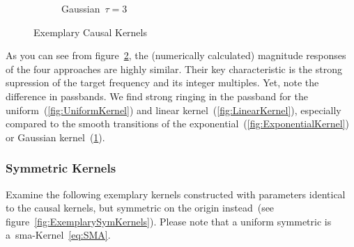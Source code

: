 \documentclass[a4paper]{article}
\newcommand{\figref}[1]{(see figure~\ref{#1})}
\begin{document}
\begin{figure}[hbtp]
\begin{subfigure}{.245\textwidth}
        \caption{Gaussian~$\tau=3$}\label{fig:GaussKernel}
    \end{subfigure}
    \caption{Exemplary Causal Kernels}\label{fig:ExemplaryCausalKernels}
\end{figure}

As you can see from figure~\ref{fig:ExemplaryCausalKernels}, the (numerically calculated) magnitude responses of the four approaches are highly similar. Their key characteristic is the strong supression of the target frequency and its integer multiples.
Yet, note the difference in passbands. We find strong ringing in the passband for the uniform~(\ref{fig:UniformKernel}) and linear kernel~(\ref{fig:LinearKernel}), especially compared to the smooth transitions of the exponential~(\ref{fig:ExponentialKernel}) or Gaussian kernel~(\ref{fig:GaussKernel}).

\subsubsection{Symmetric Kernels}

Examine the following exemplary kernels constructed with parameters identical to the causal kernels, but symmetric on the origin instead~\figref{fig:ExemplarySymKernels}. Please note that a uniform symmetric is a~\gls{sma}-Kernel~\eqref{eq:SMA}.
\end{document}

